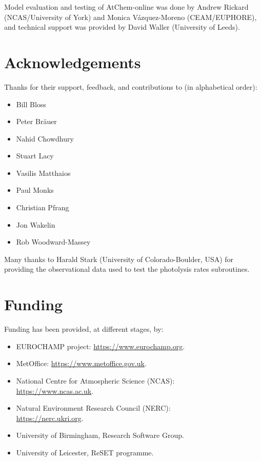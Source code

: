 Model evaluation and testing of AtChem-online was done by Andrew
Rickard (NCAS/University of York) and Monica V{\'a}zquez-Moreno
(CEAM/EUPHORE), and technical support was provided by David Waller
(University of Leeds).

\section{Acknowledgements} \label{sec:acknowledgements}

Thanks for their support, feedback, and contributions to (in
alphabetical order):

\begin{itemize}
\item Bill Bloss
\item Peter Br{\"a}uer
\item Nahid Chowdhury
\item Stuart Lacy
\item Vasilis Matthaios
\item Paul Monks
\item Christian Pfrang
\item Jon Wakelin
\item Rob Woodward-Massey
\end{itemize}

Many thanks to Harald Stark (University of Colorado-Boulder, USA) for
providing the observational data used to test the photolysis rates
subroutines.

\section{Funding} \label{sec:funding}

Funding has been provided, at different stages, by:

\begin{itemize}
\item EUROCHAMP project: \url{https://www.eurochamp.org}.
\item MetOffice: \url{https://www.metoffice.gov.uk}.
\item National Centre for Atmospheric Science (NCAS):\\ \url{https://www.ncas.ac.uk}.
\item Natural Environment Research Council (NERC):\\ \url{https://nerc.ukri.org}.
\item University of Birmingham, Research Software Group.
\item University of Leicester, ReSET programme.
\end{itemize}
